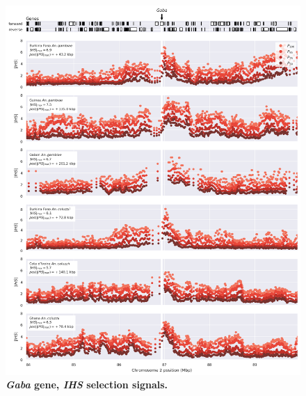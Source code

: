 \documentclass[a4paper,11pt,abstracton,hidelinks]{scrartcl}
\begin{document}
\begin{figure}[t!]
	\begin{center}
		\includegraphics*[width=1.1\linewidth,center]{artwork/locus_gaba_ihs.png}
	\end{center}
	\caption[\textit{Gaba} gene, \textit{IHS} selection signals]{
	\textbf{\textit{Gaba} gene, \textit{IHS} selection signals.}
	} 
	\label{fig:locus_gaba_ihs}
\end{figure}


\clearpage
\end{document}
